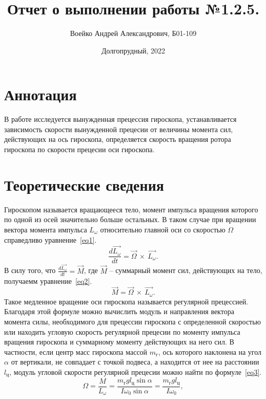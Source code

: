 \documentclass[a4paper,11pt]{article}
\title{Отчет о выполнении работы №1.2.5.}
\author{Воейко Андрей Александрович, Б01-109}
\date{Долгопрудный, 2022}
\begin{document}
\maketitle
\newpage
\section{Аннотация}
В работе исследуется вынужденная прецессия гироскопа, устанавливается зависимость скорости вынужденной прецесии от величины момента сил, действующих на ось гироскопа, определяется скорость вращения ротора гироскопа по скорости прецесии оси гироскопа.
\section{Теоретические сведения}
Гироскопом называется вращающееся тело, момент импульса вращения которого по одной из осей значительно больше остальных. В таком случае при вращении вектора момента импульса $L_{\omega}$ относительно главной оси со скоростью $\Omega$ справедливо уравнение~\ref{eq1}.\newline
\begin{equation}    \label{eq1}
  \frac{d \overrightarrow{L_{\omega}}}{dt} = \overrightarrow{\Omega}\ \times\ \overrightarrow{L_{\omega}}.
\end{equation}
В силу того, что $\frac{d \overrightarrow{L_{\omega}}}{dt} = \overrightarrow{M}$, где $\overrightarrow{M}$ -- суммарный момент сил, действующих на тело, получаемм уравнение~\ref{eq2}.\newline
\begin{equation}    \label{eq2}
  \overrightarrow{M} = \overrightarrow{\Omega}\ \times\ \overrightarrow{L_{\omega}}.
\end{equation}
Такое медленное вращение оси гироскопа называется регулярной прецессией.\newline
Благодаря этой формуле можно вычислить модуль и направления вектора момента силы, необходимого для прецессии гироскопа с определенной скоростью или находить угловую скорость регулярной прецесии по моменту импульса вращения гироскопа и суммарному моменту действующих на него сил.\newline
В частности, если центр масс гироскопа массой $m_{г}$, ось которого наклонена на угол $\alpha$ от вертикали, не совпадает с точкой подвеса, а находится от нее на расстоянии $l_{ц}$, модуль угловой скорости регулярной прецесии можно найти по формуле~\ref{eq3}.\newline
\begin{equation}    \label{eq3}
  \Omega = \frac{M}{L_{\omega}} = \frac{m_{г}gl_{ц} \sin\alpha}{I \omega_{0} \sin\alpha} = \frac{m_{г}gl_{ц}}{I \omega_{0}},
\end{equation}
\end{document}
